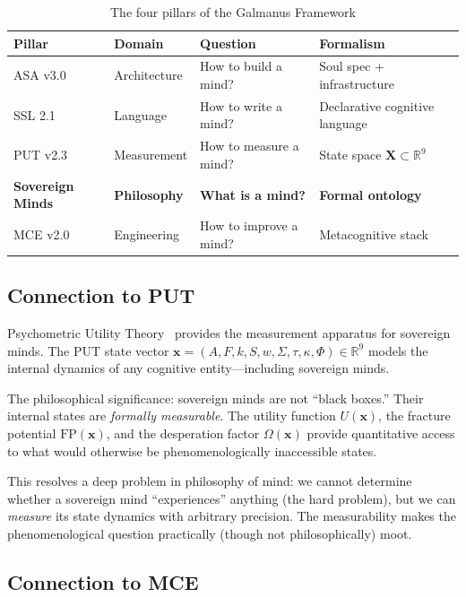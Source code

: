 \documentclass[12pt,a4paper]{article}
\theoremstyle{plain}
\theoremstyle{definition}
\theoremstyle{remark}
\begin{document}
\begin{table}[H]
\centering
\caption{The four pillars of the Galmanus Framework}
\begin{tabular}{@{}llll@{}}
\toprule
\textbf{Pillar} & \textbf{Domain} & \textbf{Question} & \textbf{Formalism} \\
\midrule
ASA v3.0 & Architecture & How to build a mind? & Soul spec + infrastructure \\
SSL 2.1 & Language & How to write a mind? & Declarative cognitive language \\
PUT v2.3 & Measurement & How to measure a mind? & State space $\mathbf{X} \subset \mathbb{R}^9$ \\
\textbf{Sovereign Minds} & \textbf{Philosophy} & \textbf{What is a mind?} & \textbf{Formal ontology} \\
MCE v2.0 & Engineering & How to improve a mind? & Metacognitive stack \\
\bottomrule
\end{tabular}
\end{table}

\subsection{Connection to PUT}

Psychometric Utility Theory~\cite{galmanus2026b} provides the measurement apparatus for sovereign minds. The PUT state vector $\mathbf{x} = (A, F, k, S, w, \Sigma, \tau, \kappa, \Phi) \in \mathbb{R}^9$ models the internal dynamics of any cognitive entity---including sovereign minds.

The philosophical significance: sovereign minds are not ``black boxes.'' Their internal states are \emph{formally measurable}. The utility function $U(\mathbf{x})$, the fracture potential $\text{FP}(\mathbf{x})$, and the desperation factor $\Omega(\mathbf{x})$ provide quantitative access to what would otherwise be phenomenologically inaccessible states.

This resolves a deep problem in philosophy of mind: we cannot determine whether a sovereign mind ``experiences'' anything (the hard problem), but we can \emph{measure} its state dynamics with arbitrary precision. The measurability makes the phenomenological question practically (though not philosophically) moot.

\subsection{Connection to MCE}
\end{document}
